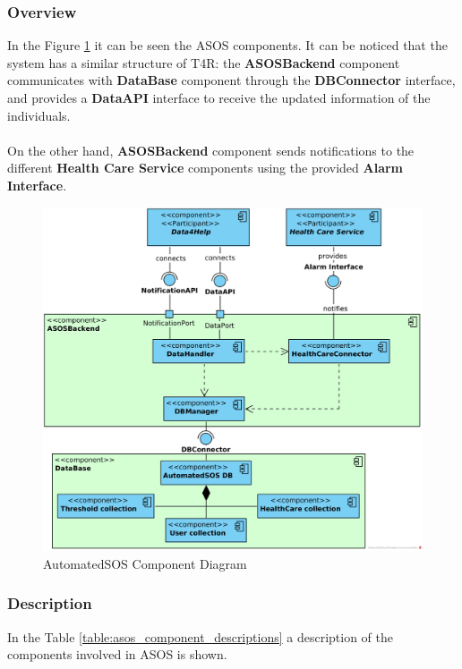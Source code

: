 \documentclass[a4paper, hidelinks, 12pt]{report}
\begin{document}
				\subsubsection{Overview}
			In the Figure \ref{fig:asos_component_diagram} it can be seen the ASOS components. It can be noticed that the system has a similar structure of T4R: the \textbf{ASOSBackend} component communicates  with \textbf{DataBase} component through the \textbf{DBConnector} interface, and provides a \textbf{DataAPI} interface to receive the updated information of the individuals.\\\\
			On the other hand, \textbf{ASOSBackend} component sends notifications to the different \textbf{Health Care Service} components using the provided \textbf{Alarm Interface}.
			\begin{figure}[H]
				\centering
				\includegraphics[width=1\textwidth]{diagrams/asos_component_diagram.png}
				\caption[AutomatedSOS Component Diagram]{AutomatedSOS Component Diagram}
				\label{fig:asos_component_diagram}
			\end{figure}	
			\subsubsection{Description}
			In the Table \ref{table:asos_component_descriptions} a description of the components involved in ASOS is shown.
			
\end{document}
